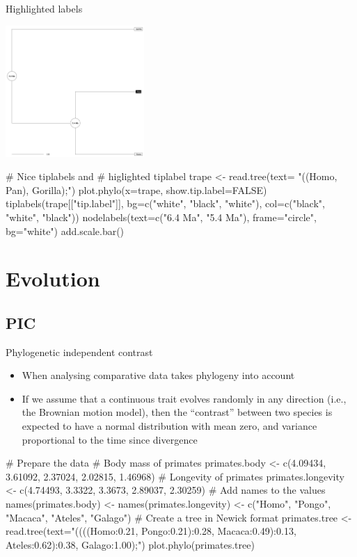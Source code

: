 \documentclass[compress, ucs, xelatex, 11pt, xcolor=svgnames,
  hyperref={
    bookmarks=true,
    unicode=true,
    colorlinks=true,
    pdftitle={Molecular data in R},
    plainpages=false,
    pdfauthor={Vojtech Zeisek},
    pdfsubject={Course about phylogeny and evolution in R},
    pdfcreator={XeLaTeX},
    pdfkeywords={R, evolution, phylogeny, molecular data},
    linkcolor=Tomato,
    anchorcolor=SaddleBrown,
    citecolor=Goldenrod,
    filecolor=DarkMagenta,
    menucolor=Sienna,
    urlcolor=DarkTurquoise,
    pdftex},
  url={hyphens, lowtilde} %
  ]{beamer}
\begin{document}
\begin{frame}[fragile]{Highlighted labels}
\begin{multicols}{2}
  \includegraphics[height=5cm]{highlight.png}
  \columnbreak
  \begin{spluscode}
    # Nice tiplabels and
    # higlighted tiplabel
    trape <- read.tree(text=
      "((Homo, Pan), Gorilla);")
    plot.phylo(x=trape,
      show.tip.label=FALSE)
    tiplabels(trape[["tip.label"]],
      bg=c("white", "black",
      "white"), col=c("black",
      "white", "black"))
    nodelabels(text=c("6.4 Ma",
      "5.4 Ma"), frame="circle",
      bg="white")
    add.scale.bar()
  \end{spluscode}
\end{multicols}
\end{frame}

\section{Evolution}

\subsection{PIC}

\begin{frame}[fragile]{Phylogenetic independent contrast}
\begin{itemize}
 \item When analysing comparative data takes phylogeny into account
 \item If we assume that a continuous trait evolves randomly in any direction (i.e., the Brownian motion model), then the ``contrast'' between two species is expected to have a normal distribution with mean zero, and variance proportional to the time since divergence
\end{itemize}
  \begin{spluscode}
    # Prepare the data # Body mass of primates
    primates.body <- c(4.09434, 3.61092, 2.37024, 2.02815, 1.46968)
    # Longevity of primates
    primates.longevity <- c(4.74493, 3.3322, 3.3673, 2.89037, 2.30259)
    # Add names to the values
    names(primates.body) <- names(primates.longevity) <- c("Homo", "Pongo",
      "Macaca", "Ateles", "Galago")
    # Create a tree in Newick format
    primates.tree <- read.tree(text="((((Homo:0.21, Pongo:0.21):0.28,
      Macaca:0.49):0.13, Ateles:0.62):0.38, Galago:1.00);")
    plot.phylo(primates.tree)
  \end{spluscode}
\end{frame}
\end{document}
